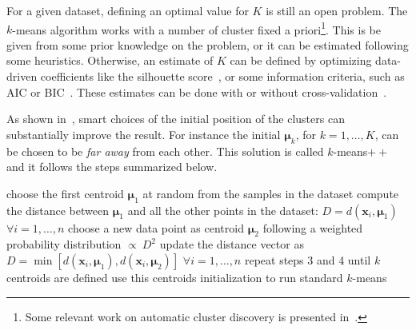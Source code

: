     For a given dataset, defining an optimal value for $K$ is still an open problem. The $k$-means algorithm works with a number of cluster fixed a priori\footnote{ Some relevant work on automatic cluster discovery is presented in~\cite{ball1967clustering, pelleg2000x, muhr2009automatic}.}.
    This is be given from some prior knowledge on the problem, or it can be estimated following some heuristics. Otherwise, an estimate of $K$ can be defined by optimizing data-driven coefficients like the silhouette score~\cite{rousseeuw1987silhouettes}, or some information criteria, such as \ac{AIC} or \ac{BIC}~\cite{bishop2006pattern}.
    These estimates can be done with or without cross-validation~\cite{fiorini2017adenine}.
    
    As shown in~\cite{arthur2007k}, smart choices of the initial position of the clusters can substantially improve the result. For instance the initial $\bm{\mu}_k$, for $k=1,\dots,K$, can be chosen to be \textit{far away} from each other.
    This solution is called $k$-means$++$ and it follows the steps summarized below.

	\begin{algorithm}[h!]
		\begin{algorithmic}[1]
			\State choose the first centroid $\bm{\mu}_1$ at random from the samples in the dataset
			\State compute the distance between $\bm{\mu}_1$ and all the other points in the dataset: $D = d(\bm{x}_i, \bm{\mu}_1)$ $\forall i=1,\dots,n$
			\State choose a new data point as centroid $\bm{\mu}_2$ following a weighted probability distribution $\propto~D^2$
			\State update the distance vector as $D = \min[d(\bm{x}_i, \bm{\mu}_1), d(\bm{x}_i, \bm{\mu}_2)]$ $\forall i=1,\dots,n$
			\State repeat steps 3 and 4 until $k$ centroids are defined
			\State use this centroids initialization to run standard $k$-means
		\end{algorithmic}
	\end{algorithm}


